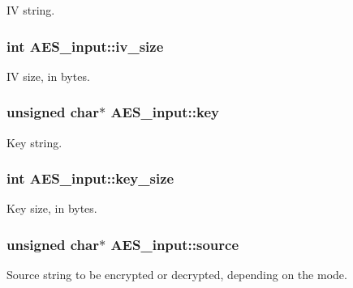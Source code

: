I\+V string. 

\hypertarget{struct_a_e_s__input_a42171c2a76a538022c24e3612f089f15}{
\subsubsection[{iv\+\_\+size}]{\setlength{\rightskip}{0pt plus 5cm}int A\+E\+S\+\_\+input\+::iv\+\_\+size}}\label{struct_a_e_s__input_a42171c2a76a538022c24e3612f089f15}


I\+V size, in bytes. 

\hypertarget{struct_a_e_s__input_a8e2f1bbcd8a1be74df6009c12b3287fd}{
\subsubsection[{key}]{\setlength{\rightskip}{0pt plus 5cm}unsigned char$\ast$ A\+E\+S\+\_\+input\+::key}}\label{struct_a_e_s__input_a8e2f1bbcd8a1be74df6009c12b3287fd}


Key string. 

\hypertarget{struct_a_e_s__input_a23eb3f0cf6f80d5af65710b78e3764d1}{
\subsubsection[{key\+\_\+size}]{\setlength{\rightskip}{0pt plus 5cm}int A\+E\+S\+\_\+input\+::key\+\_\+size}}\label{struct_a_e_s__input_a23eb3f0cf6f80d5af65710b78e3764d1}


Key size, in bytes. 

\hypertarget{struct_a_e_s__input_a21c889ef9f8bd57ede165b4a8345b56e}{
\subsubsection[{source}]{\setlength{\rightskip}{0pt plus 5cm}unsigned char$\ast$ A\+E\+S\+\_\+input\+::source}}\label{struct_a_e_s__input_a21c889ef9f8bd57ede165b4a8345b56e}


Source string to be encrypted or decrypted, depending on the mode. 

